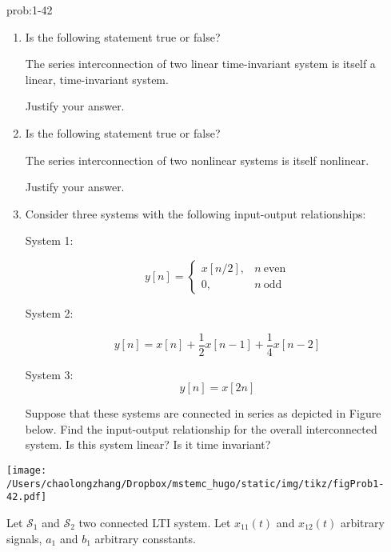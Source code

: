 \documentclass[koma,a4paper,utopia,12pt,listings-color,microtype,paralist,colorlinks,urlcolor=red]{org-article}
\begin{document}
\begin{prob}[]{prob:1-42}
\begin{enumerate}
\item Is the following statement true or false?

The series interconnection of two linear time-invariant system is itself
a linear, time-invariant system.

Justify your answer.

\item Is the following statement true or false?

The series interconnection of two nonlinear systems is itself nonlinear.

Justify your answer.

\item Consider three systems with the following input-output relationships:

System 1:

\begin{equation*}
 y[n] =
 \begin{cases}
 x[n/2], & n\ \mathrm{even} \\
 0, & n\ \mathrm{odd}
 \end{cases}
\end{equation*}

System 2:

\begin{equation*}
y[n]  = x[n] + \frac{1}{2}x[n-1] + \frac{1}{4}x[n-2]
\end{equation*}

System 3:
\begin{equation*}
y[n] = x[2n]
\end{equation*}

Suppose that these systems are connected in series as depicted in Figure
below. Find the input-output relationship for the overall interconnected
system. Is this system linear? Is it time invariant?
\end{enumerate}

\begin{center}
\texttt{[image: /Users/chaolongzhang/Dropbox/mstemc\_hugo/static/img/tikz/figProb1-42.pdf]}
\end{center}
\label{prob:1-42}
\end{prob}

Let \(\mathcal{S}_{1}\) and \(\mathcal{S}_{2}\) two connected LTI system. Let
\(x_{11}(t)\) and \(x_{12}(t)\) arbitrary signals, \(a_{1}\) and \(b_{1}\)
arbitrary consstants.
\end{document}
